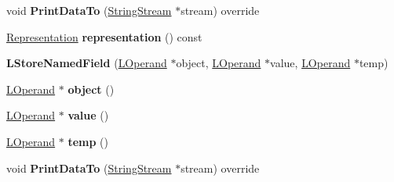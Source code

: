 \begin{DoxyCompactItemize}
\item 
void {\bfseries Print\+Data\+To} (\hyperlink{classv8_1_1internal_1_1_string_stream}{String\+Stream} $\ast$stream) override\hypertarget{classv8_1_1internal_1_1_l_store_named_field_a737f49c6847cd030f17c69b314c54b6c}{}\label{classv8_1_1internal_1_1_l_store_named_field_a737f49c6847cd030f17c69b314c54b6c}

\item 
\hyperlink{classv8_1_1internal_1_1_representation}{Representation} {\bfseries representation} () const \hypertarget{classv8_1_1internal_1_1_l_store_named_field_acf09ef122d9ca6738894c92b8f3e24ef}{}\label{classv8_1_1internal_1_1_l_store_named_field_acf09ef122d9ca6738894c92b8f3e24ef}

\item 
{\bfseries L\+Store\+Named\+Field} (\hyperlink{classv8_1_1internal_1_1_l_operand}{L\+Operand} $\ast$object, \hyperlink{classv8_1_1internal_1_1_l_operand}{L\+Operand} $\ast$value, \hyperlink{classv8_1_1internal_1_1_l_operand}{L\+Operand} $\ast$temp)\hypertarget{classv8_1_1internal_1_1_l_store_named_field_a6d2a4f20bdb4927c9401f7f7dd706d15}{}\label{classv8_1_1internal_1_1_l_store_named_field_a6d2a4f20bdb4927c9401f7f7dd706d15}

\item 
\hyperlink{classv8_1_1internal_1_1_l_operand}{L\+Operand} $\ast$ {\bfseries object} ()\hypertarget{classv8_1_1internal_1_1_l_store_named_field_a322fe15f20a68dfd3429f31bb46ce109}{}\label{classv8_1_1internal_1_1_l_store_named_field_a322fe15f20a68dfd3429f31bb46ce109}

\item 
\hyperlink{classv8_1_1internal_1_1_l_operand}{L\+Operand} $\ast$ {\bfseries value} ()\hypertarget{classv8_1_1internal_1_1_l_store_named_field_a7c1b623b85070a53e7c8ca36113808c7}{}\label{classv8_1_1internal_1_1_l_store_named_field_a7c1b623b85070a53e7c8ca36113808c7}

\item 
\hyperlink{classv8_1_1internal_1_1_l_operand}{L\+Operand} $\ast$ {\bfseries temp} ()\hypertarget{classv8_1_1internal_1_1_l_store_named_field_ad77491ce510eaa0f150539ec8815c14f}{}\label{classv8_1_1internal_1_1_l_store_named_field_ad77491ce510eaa0f150539ec8815c14f}

\item 
void {\bfseries Print\+Data\+To} (\hyperlink{classv8_1_1internal_1_1_string_stream}{String\+Stream} $\ast$stream) override\hypertarget{classv8_1_1internal_1_1_l_store_named_field_a737f49c6847cd030f17c69b314c54b6c}{}\label{classv8_1_1internal_1_1_l_store_named_field_a737f49c6847cd030f17c69b314c54b6c}


\end{DoxyCompactItemize}
